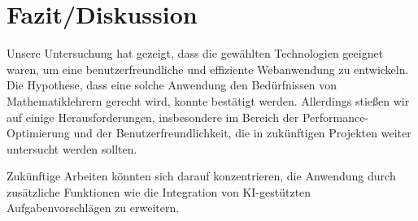 
\section{Fazit/Diskussion}
Unsere Untersuchung hat gezeigt, dass die gewählten Technologien geeignet waren, um eine benutzerfreundliche und effiziente Webanwendung zu entwickeln. Die Hypothese, dass eine solche Anwendung den Bedürfnissen von Mathematiklehrern gerecht wird, konnte bestätigt werden. Allerdings stießen wir auf einige Herausforderungen, insbesondere im Bereich der Performance-Optimierung und der Benutzerfreundlichkeit, die in zukünftigen Projekten weiter untersucht werden sollten.

Zukünftige Arbeiten könnten sich darauf konzentrieren, die Anwendung durch zusätzliche Funktionen wie die Integration von KI-gestützten Aufgabenvorschlägen zu erweitern.